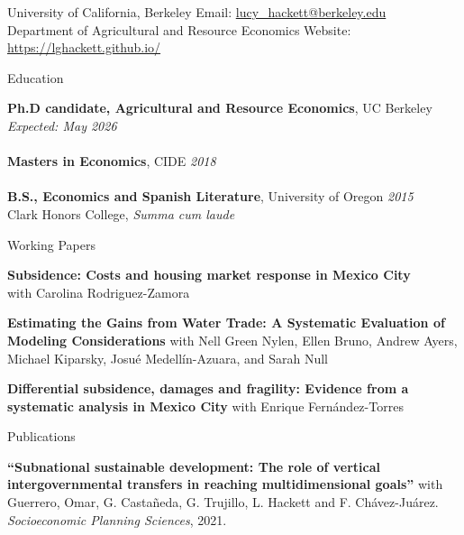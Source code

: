 \documentclass{resume} %
\begin{document}
\begin{rSection}{}
University of California, Berkeley \hfill Email:  \href{mailto:lucy\_hackett@berkeley.edu}{lucy\_hackett@berkeley.edu}\\
Department of Agricultural and Resource Economics \hfill Website:  \href{https://lghackett.github.io/}{https://lghackett.github.io/}\\
\end{rSection}


\begin{rSection}{Education}

{\textbf{Ph.D candidate, Agricultural and Resource Economics}, UC Berkeley} \hfill {\em Expected: May 2026} \\
\\{\textbf{Masters in Economics}, CIDE} \hfill {\em 2018} \\
\\{\textbf{B.S., Economics and Spanish Literature}, University of Oregon} \hfill {\em 2015} 
\\Clark Honors College, \textit{Summa cum laude}   \hfill
\end{rSection}


\begin{rSection}{Working Papers}
\item \textbf{Subsidence: Costs and housing market response in Mexico City} \\ with Carolina Rodriguez-Zamora
\item \textbf{Estimating the Gains from Water Trade: A Systematic Evaluation of Modeling Considerations} with Nell Green Nylen, Ellen Bruno, Andrew Ayers, Michael Kiparsky, Josué Medellín-Azuara, and Sarah Null
\item \textbf{Differential subsidence, damages and fragility: Evidence from a systematic analysis in Mexico City} with Enrique Fernández-Torres
\end{rSection}

\begin{rSection}{Publications}
\item \textbf{``Subnational sustainable development: The role of vertical intergovernmental transfers in reaching multidimensional goals''} with Guerrero, Omar, G. Castañeda, G. Trujillo, L. Hackett and F. Chávez-Juárez. \textit{Socioeconomic Planning Sciences}, 2021.
\end{rSection}
\end{document}
